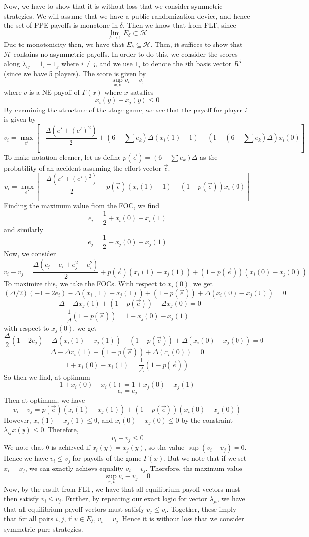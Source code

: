 \documentclass[10pt,letter]{article}
\begin{document}
Now, we have to show that it is without loss that we consider symmetric strategies. We will assume that we have a public randomization device, and hence the set of PPE payoffs is monotone in $\delta$. Then we know that from FLT, since
\[ \lim_{\delta \to 1} E_\delta \subset \mathcal{H} \]
Due to monotonicity then, we have that $E_\delta \subseteq \mathcal{H}$. Then, it suffices to show that $\mathcal{H}$ contains no asymmetric payoffs. In order to do this, we consider the scores along $\lambda_{ij} = 1_i - 1_j$ where $i \neq j$, and we use $1_i$ to denote the $i$th basis vector $R^5$ (since we have 5 players). The score is given by
\[ \sup_{x,v} v_i - v_j \]
where $v$ is a NE payoff of $\Gamma(x)$ where $x$ satsifies
\[ x_i(y) - x_j(y) \le 0 \]
By examining the structure of the stage game, we see that the payoff for player $i$ is given by
\[ v_i = \max_{e'} \left[ - \frac{\Delta(e' + (e')^2)}{2} + \left(6-\sum e_k \right)\Delta (x_i(1) - 1)  + \left(1 - \left(6-\sum e_k \right)\Delta \right)x_i(0) \right] \]
To make notation cleaner, let us define $p(\vec{e}) = \left(6-\sum e_k \right)\Delta$ as the probability of an accident assuming the effort vector $\vec{e}$.
\[ v_i = \max_{e'} \left[ - \frac{\Delta(e' + (e')^2)}{2} + p(\vec{e}) (x_i(1) - 1)  + \left(1 - p(\vec{e}) \right)x_i(0) \right] \]
Finding the maximum value from the FOC, we find
\[ e_i = \frac{1}{2} + x_i(0) - x_i(1) \]
and similarly
\[ e_j = \frac{1}{2} + x_j(0) - x_j(1) \]
Now, we consider
\[ v_i - v_j = \frac{\Delta(e_j - e_i + e_j^2 - e_i^2)}{2} + p(\vec{e}) (x_i(1) - x_j(1))  + \left(1 - p(\vec{e}) \right)(x_i(0) - x_j(0)) \]
To maximize this, we take the FOCs. With respect to $x_i(0)$, we get
\[ (\Delta/2)(-1 - 2e_i) - \Delta (x_i(1) - x_j(1)) + (1 - p(\vec{e})) + \Delta (x_i(0) - x_j(0)) = 0 \]
\[ -\Delta+ \Delta x_j(1) + (1 - p(\vec{e})) - \Delta x_j(0) = 0 \]
\[ \frac{1}{\Delta} (1-p(\vec{e})) = 1 + x_j(0) - x_j(1) \]
with respect to $x_j(0)$, we get
\[ \frac{\Delta}{2}(1 + 2e_j) - \Delta(x_i(1) - x_j(1)) - (1 - p(\vec{e})) + \Delta(x_i(0) - x_j(0)) = 0 \]
\[ \Delta - \Delta x_i(1)  - (1 - p(\vec{e})) + \Delta(x_i(0)) = 0 \]
\[ 1  + x_i(0)-  x_i(1)  = \frac{1}{\Delta}(1 - p(\vec{e})) \]
So then we find, at optimum
\[1  + x_i(0)-  x_i(1) = 1 + x_j(0) - x_j(1) \]
\[ e_i = e_j \]
Then at optimum, we have
\[ v_i - v_j = p(\vec{e}) (x_i(1) - x_j(1))  + \left(1 - p(\vec{e}) \right)(x_i(0) - x_j(0))  \]
However, $x_i(1) - x_j(1) \le 0$, and $x_i(0) - x_j(0) \le 0$ by the constraint $\lambda_{ij} x(y) \le 0$. Therefore,
\[ v_i - v_j \le 0 \]
We note that 0 is achieved if $x_i(y) = x_j(y)$, so the value  $\sup (v_i - v_j) = 0$.
Hence we have $v_i \le v_j$ for payoffs of the game $\Gamma(x)$. But we note that if we set $x_i = x_j$, we can exactly achieve equality $v_i = v_j$. Therefore, the maximum value
\[ \sup_{x,v} v_i - v_j = 0\]
Now, by the result from FLT, we have that all equilibrium payoff vectors must then satisfy $v_i \le v_j$. Further, by repeating our exact logic for vector $\lambda_{ji}$, we have that all equilibrium payoff vectors must satisfy $v_j \le v_i$. Together, these imply that for all pairs $i,j$, if $v \in E_{\delta}$, $v_i = v_j$. Hence it is without loss that we consider symmetric pure strategies.
\end{document}

